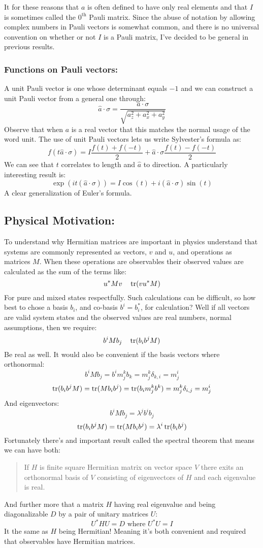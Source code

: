It for these reasons that $a$ is often defined to have only real elements and that $I$ is sometimes called the $0^\text{th}$ Pauli matrix.
Since the abuse of notation by allowing complex numbers in Pauli vectors is somewhat common, 
and there is no universal convention on whether or not $I$ is a Pauli matrix,
I've decided to be general in previous results.

\subsubsection{Functions on Pauli vectors:}
A unit Pauli vector is one whose determinant equals $-1$ and we can construct a unit Pauli vector from a general one through: 
\[\hat{a}\cdot\sigma = \frac{a\cdot\sigma}{\sqrt{a_z^2+a_x^2+a_y^2}}\]
Observe that when $a$ is a real vector that this matches the normal usage of the word unit.
The use of unit Pauli vectors lets us write Sylvester's formula as:
\[f(t\hat{a}\cdot\sigma)=I\frac{f(t)+f(-t)}{2}+\hat{a}\cdot\sigma\frac{f(t)-f(-t)}{2}\]
We can see that $t$ correlates to length and $\hat{a}$ to direction.
A particularly interesting result is:
\[\exp(it(\hat{a}\cdot\sigma))=I\cos(t)+i(\hat{a}\cdot\sigma)\sin(t)\]
A clear generalization of Euler's formula.

\subsection{Physical Motivation:}
To understand why Hermitian matrices are important in physics understand that systems are commonly represented as vectors, $v$ and $u$, and operations as matrices $M$.
When these operations are observables their observed values are calculated as the sum of the terms like:
\[u^*Mv\quad \operatorname{tr}(vu^*M)\]
For pure and mixed states respectfully.
Such calculations can be difficult,
so how best to chose a basis $b_i$,
and co-basis $b^i = b_i^*$,
for calculation?
Well if all vectors are valid system states and the observed values are real numbers,
normal assumptions,
then we require:
\[b^iMb_j\quad \operatorname{tr}(b_ib^jM)\]
Be real as well.
It would also be convenient if the basis vectors where orthonormal:
\[b^iMb_j = b^im^k_jb_k=m^k_j\delta_{k,i}=m^i_j\]
\[\operatorname{tr}(b_ib^jM) = \operatorname{tr}(Mb_ib^j) = \operatorname{tr}(b_im^k_jb^k) = m^k_j\delta_{i,j}=m^i_j\]
And eigenvectors:
\[b^iMb_j=\lambda^jb^ib_j\]
\[\operatorname{tr}(b_ib^jM) = \operatorname{tr}(Mb_ib^j) = \lambda^i\operatorname{tr}(b_ib^j)\]
Fortunately there's and important result called the spectral theorem that means we can have both:
\begin{quote}
If $H$ is finite square Hermitian matrix on vector space $V$ there exits an orthonormal basis of $V$ consisting of eigenvectors of $H$ and each eigenvalue is real.
\end{quote}
And further more that a matrix $H$ having real eigenvalue and being diagonalizable $D$ by a pair of unitary matrices $U$:
\[ U^*HU = D \text{ where } U^*U=I\]
It the same as $H$ being Hermitian!
Meaning it's both convenient and required that observables have Hermitian matrices.
\\

